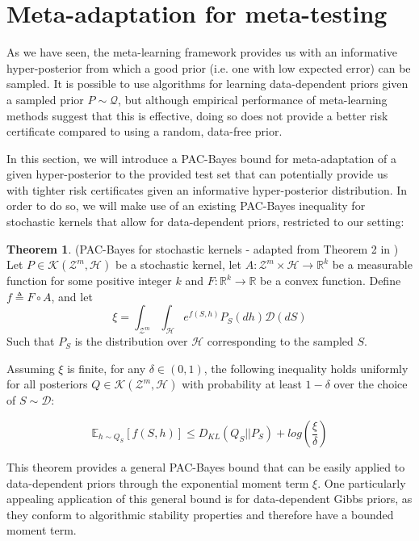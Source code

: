 \documentclass{article}
\theoremstyle{definition}
\newtheorem{theorem}{Theorem}[section]
\newcommand{\Expect}[2]{\mathbb{E}_{#1}\left [#2 \right ]}
\begin{document}
\section{Meta-adaptation for meta-testing}

As we have seen, the meta-learning framework provides us with an informative hyper-posterior from which a good prior (i.e. one with low expected error) can be sampled. It is possible to use algorithms for learning data-dependent priors given a sampled prior $P\sim \mathcal{Q}$, but although empirical performance of meta-learning methods suggest that this is effective, doing so does not provide a better risk certificate compared to using a random, data-free prior. 

In this section, we will introduce a PAC-Bayes bound for meta-adaptation of a given hyper-posterior to the provided test set that can potentially provide us with tighter risk certificates given an informative hyper-posterior distribution.
In order to do so, we will make use of an existing PAC-Bayes inequality \citep{Rivasplata2020} for stochastic kernels that allow for data-dependent priors, restricted to our setting:

\begin{theorem} (PAC-Bayes for stochastic kernels - adapted from Theorem 2 in \citet{Rivasplata2020}) \label{thm:rivasplata-pb}
	Let $P\in \mathcal{K}(\mathcal{Z}^m, \mathcal{H})$ be a stochastic kernel, let $A: \mathcal{Z}^m\times \mathcal{H}\rightarrow \mathbb{R}^k$ be a measurable function for some positive integer $k$ and $F:\mathbb{R}^k\rightarrow \mathbb{R}$ be a convex function.
	Define $f\triangleq F\circ A$, and let 
	$$\xi=\int_{\mathcal{Z}^m}\int_{\mathcal{H}}e^{f(S, h)}P_S(dh)\mathcal{D}(dS)$$
	Such that $P_S$ is the distribution over $\mathcal{H}$ corresponding to the sampled $S$.
	
	Assuming $\xi$ is finite, for any $\delta \in (0,1)$, the following inequality holds uniformly for all posteriors $Q\in \mathcal{K}(\mathcal{Z}^m, \mathcal{H})$ with probability at least $1-\delta$ over the choice of $S\sim \mathcal{D}$:
	
	\begin{equation} \label{eq:ribasplata-pb}
	\Expect{h\sim Q_S}{f(S, h)} \leq D_{KL}(Q_S||P_S)+log\left (\frac{\xi}{\delta}\right )
	\end{equation}
\end{theorem}

This theorem provides a general PAC-Bayes bound that can be easily applied to data-dependent priors through the exponential moment term $\xi$. One particularly appealing application of this general bound is for data-dependent Gibbs priors, as they conform to algorithmic stability properties \citep{Kuzborskij2019} and therefore have a bounded moment term.
\end{document}
